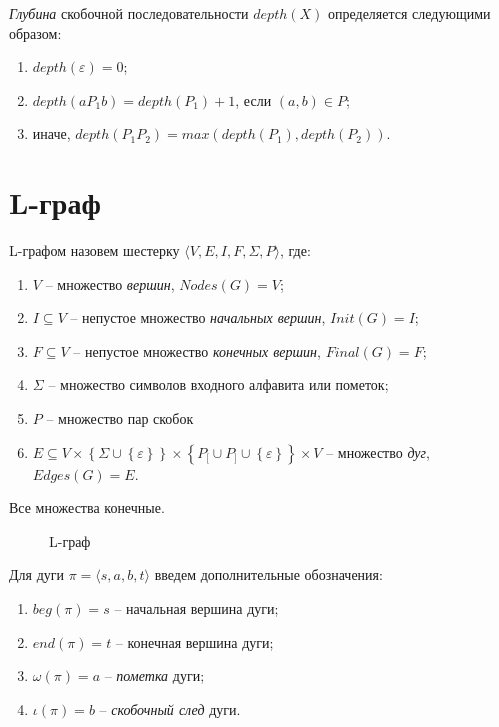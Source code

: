 \emph{Глубина} скобочной последовательности $depth(X)$ определяется следующими образом:
\begin{enumerate}[label=\arabic*)]
    \item $depth(\varepsilon) = 0$;
    \item $depth(a P_1 b) = depth(P_1) + 1$, если $(a, b) \in P$;
    \item иначе, $depth(P_1 P_2) = max(depth(P_1), depth(P_2))$.
\end{enumerate}

\section{L-граф}
L-графом назовем шестерку $\langle V,E,I,F,\Sigma,P\rangle$, где:
\begin{enumerate}[label=\arabic*)]
    \item $V$ -- множество \emph{вершин}, $Nodes(G) = V$;
    \item $I \subseteq V$ -- непустое множество \emph{начальных вершин}, $Init(G) = I$;
    \item $F \subseteq V$ -- непустое множество \emph{конечных вершин}, $Final(G) = F$;
    \item $\Sigma$ -- множество символов входного алфавита или пометок;
    \item $P$ -- множество пар скобок
    \item $E \subseteq V 
                    \times \left\{ \Sigma \cup \left\{ \varepsilon \right\}\right\} 
                    \times \left\{ P_[ \cup P_] \cup \left\{ \varepsilon \right\} \right\} 
                    \times V $
        -- множество \emph{дуг}, $Edges(G) = E$.
\end{enumerate}
Все множества конечные.

\begin{figure}
    \centering
    
    \caption{L-граф}
    \label{lgraph1-expample-image}
    
\end{figure}

Для дуги $\pi = \langle s, a, b, t \rangle$ введем дополнительные обозначения:
\begin{enumerate}[label=\arabic*)]
    \item $beg(\pi) = s$ -- начальная вершина дуги;
    \item $end(\pi) = t$ -- конечная вершина дуги;
    \item $\omega(\pi) = a$ -- \emph{пометка} дуги;
    \item $\iota(\pi) = b$ -- \emph{скобочный след} дуги.
\end{enumerate}

